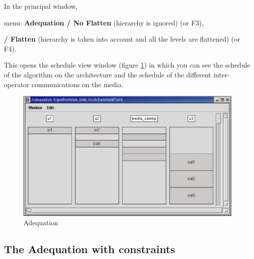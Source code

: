 \documentclass[a4paper,twoside]{report}
\begin{document}
In the principal window, 

menu: \textbf{Adequation / No Flatten} (hierarchy is ignored) (or F3),

\hspace{81pt}\textbf{/ Flatten} (hierarchy is taken into account and all the
levels are flattened) (or F4).

This opens the schedule view window (figure \ref{adequation}) in which you can
see the schedule of the algorithm on the architecture and the schedule of the different
inter-operator communications on the media.
\begin{figure}[htbp]
  \begin{center} 
        \includegraphics[width=1.03\linewidth]{Adequation.eps} 
  \end{center}
  \caption{Adequation} 
  \label{adequation}
\end{figure} 

\subsection{The Adequation with constraints}
\end{document}
